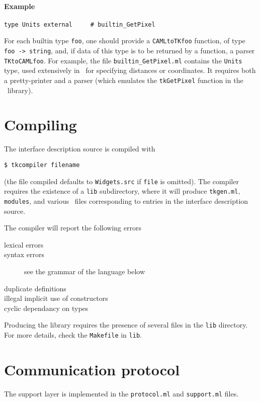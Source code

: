 \paragraph{Example}
\begin{verbatim}
type Units external     # builtin_GetPixel
\end{verbatim} 
For each builtin type \verb|foo|, one should provide a \verb|CAMLtoTKfoo|
function, of type \verb|foo -> string|, and, if data of this type is to be
returned by a function, a parser \verb|TKtoCAMLfoo|.
For example, the file \verb|builtin_GetPixel.ml| contains the \verb|Units|
type, used extensively in \tk\ for specifying distances or coordinates.
It requires both a pretty-printer and a parser (which emulates the
\verb|tkGetPixel| function in the \tk\ library).


\section{Compiling}
The interface description source is compiled with
\begin{verbatim}
$ tkcompiler filename
\end{verbatim}
(the file compiled defaults to \verb|Widgets.src| if \verb|file| is
omitted).
The compiler requires the existence of a \verb|lib| subdirectory, where it
will produce \verb|tkgen.ml|, \verb|modules|, and various \caml\ files
corresponding to entries in the interface description source.

The compiler will report the following errors
\begin{description}
\item[lexical errors]
\item[syntax errors] see the grammar of the language below
\item[duplicate definitions]
\item[illegal implicit use of constructors]
\item[cyclic dependancy on types]
\end{description} 

Producing the library requires the presence of several files in the
\verb|lib| directory. For more details, check the \verb|Makefile| in
\verb|lib|. 

\section{Communication protocol}
The support layer is implemented in the \verb|protocol.ml| and
\verb|support.ml| files.


